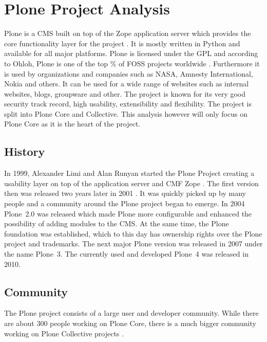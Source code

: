 \section{Plone Project Analysis} %


\noindent Plone is a \ac{CMS} built on top of the Zope application server which
provides the core functionality layer for the project
\cite{Aspeli2005,PloneFaq,PloneWhatIsPlone}. It is mostly written in Python and
available for all major platforms. Plone is licensed under the \ac{GPL} and
according to Ohloh, Plone is one of the top \unit[2]{\%} of \ac{FOSS} projects
worldwide \cite{PloneOhlohFactoids}. Furthermore it is used by organizations
and companies such as NASA, Amnesty International, Nokia and others. It can be
used for a wide range of websites such as internal websites, blogs, groupware
and other. The project is known for its very good security track record, high
usability, extensibility and flexibility. The project is split into Plone Core
and Collective. This analysis however will only focus on Plone Core as it is
the heart of the project.

\subsection{History} %

In 1999, Alexander Limi and Alan Runyan started the Plone Project creating a
usability layer on top of the application server and \ac{CMF} Zope
\cite{Aspeli2005,PloneFaq}. The first version then was released two years later
in 2001 \cite{PloneReleases}. It was quickly picked up by many people and a
community around the Plone project began to emerge. In 2004 Plone~2.0 was
released which made Plone more configurable and enhanced the possibility of
adding modules to the \ac{CMS}. At the same time, the Plone foundation was
established, which to this day has ownership rights over the Plone project and
trademarks. The next major Plone version was released in 2007 under the name
Plone~3. The currently used and developed Plone~4 was released in 2010.


\subsection{Community} %

The Plone project consists of a large user and developer community. While there
are about 300 people working on Plone Core, there is a much bigger community
working on Plone Collective projects
\cite{Aspeli2005,PloneOhlohFactoids,PloneCommunityProcesses}.

